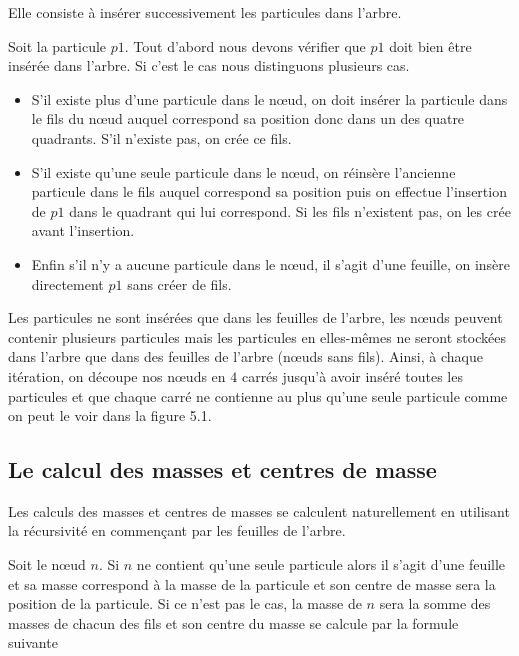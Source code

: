 Elle consiste à insérer successivement les particules dans l'arbre.

Soit la particule $p1$. Tout d'abord nous devons vérifier que $p1$ doit bien être insérée dans l'arbre.
Si c'est le cas nous distinguons plusieurs cas. 
\begin{itemize}

\item S'il existe plus d'une particule dans le nœud, on doit insérer la particule dans le fils du nœud auquel correspond sa position donc dans un des quatre quadrants. S'il n'existe pas, on crée ce fils.


\item S'il existe qu'une seule particule dans le nœud, on réinsère l'ancienne particule dans le fils auquel correspond sa position puis on effectue l'insertion de $p1$ dans le quadrant qui lui correspond. Si les fils n'existent pas, on les crée avant l'insertion. 

\item Enfin s'il n'y a aucune particule dans le nœud, il s'agit  d'une feuille, on insère directement $p1$ sans créer de fils.

\end{itemize}

Les particules ne sont insérées que dans les feuilles de l'arbre, les nœuds peuvent contenir plusieurs particules mais les particules en elles-mêmes ne seront stockées dans l'arbre que dans des feuilles de l'arbre (nœuds sans fils). Ainsi, à chaque itération, on découpe nos nœuds en $4$ carrés jusqu'à avoir inséré toutes les particules et que chaque carré ne contienne au plus qu'une seule particule comme on peut le voir dans la figure 5.1.

\subsection{Le calcul des masses et centres de masse}

Les calculs des masses et centres de masses se calculent naturellement en utilisant la récursivité en commençant par les feuilles de l'arbre.

\vspace{2mm}
Soit le nœud $n$. 
Si $n$ ne contient qu'une seule particule alors il s'agit d'une feuille et sa masse correspond à la masse de la particule et son centre de masse sera la position de la particule. Si ce n'est pas le cas, la masse de $n$ sera la somme des masses de chacun des fils et son centre du masse se calcule par la formule suivante

